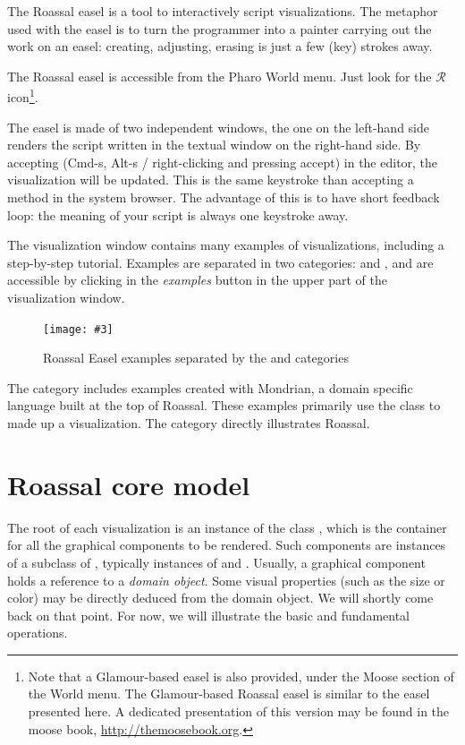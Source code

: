 \documentclass[a4paper,10pt,twoside]{book}
\newcommand{\fig}[4]{
		\begin{figure}[#1]
			\centering
			\texttt{[image: \#3]}
			\caption{\label{fig:#3}#4}
		\end{figure}}
\begin{document}
The Roassal easel is a tool to interactively script visualizations. The metaphor used with the easel is to turn the programmer into a painter carrying out the work on an easel: creating, adjusting, erasing is just a few (key) strokes away.

The Roassal easel is accessible from the Pharo World menu. Just look for the {\color{red} $\mathcal{R}$} icon\footnote{Note that a Glamour-based easel is also provided, under the Moose section of the World menu. The Glamour-based Roassal easel is similar to the easel presented here. A dedicated presentation of this version may be found in the moose book, \url{http://themoosebook.org}.}.

The easel is made of two independent windows, the one on the left-hand side renders the script written in the textual window on the right-hand side. By accepting (Cmd-s, Alt-s / right-clicking and pressing accept) in the editor, the visualization will be updated. This is the same keystroke than accepting a method in the system browser. The advantage of this is to have short feedback loop: the meaning of your script is always one keystroke away.

The visualization window contains many examples of visualizations, including a step-by-step tutorial. Examples are separated in two categories:  and , and are accessible by clicking in the \textit{examples} button in the upper part of the visualization window.

\fig{H}{0.8}{ROEasel}{Roassal Easel examples separated by the \ct{ROMondrianViewBuilder} and \ct{ROExample} categories}


The  category includes examples created with Mondrian, a domain specific language built at the top of Roassal. These examples primarily use the  class to made up a visualization. The   category directly illustrates Roassal.


\section{Roassal core model}

The root of each visualization is an instance of the class , which is the container for all the graphical components to be rendered.
Such components are instances of a subclass of , typically instances of  and . Usually, a graphical component holds a reference to a \emph{domain object}. Some visual properties (such as the size or color) may be directly deduced from the domain object. We will shortly come back on that point. For now, we will illustrate the basic and fundamental operations.
\end{document}
